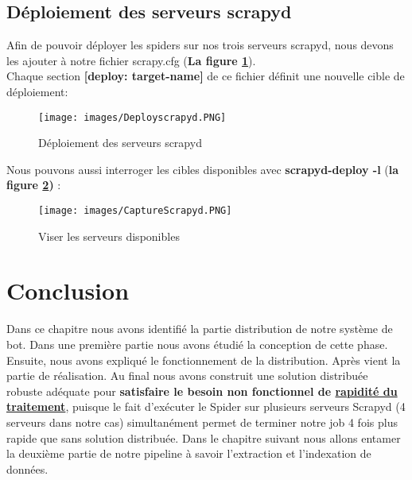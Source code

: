\subsection{Déploiement des serveurs scrapyd}
Afin de pouvoir déployer les spiders sur nos trois serveurs scrapyd, nous devons les
ajouter à notre fichier scrapy.cfg (\textbf{La figure \ref{fig:dep}}).\\
Chaque section \textbf{[deploy: target-name]} de ce fichier définit une nouvelle cible de déploiement:
\begin{figure}[H]
            \centering
            \texttt{[image: images/Deployscrapyd.PNG]}
            \caption{Déploiement des serveurs scrapyd}
            \label{fig:dep}  
        \end{figure}
\noindent Nous pouvons aussi interroger les cibles disponibles avec \textbf{scrapyd-deploy -l} (\textbf{la figure \ref{fig:vise})} :
\begin{figure}[H]
            \centering
            \texttt{[image: images/CaptureScrapyd.PNG]}
            \caption{Viser les serveurs disponibles}
            \label{fig:vise}  
        \end{figure}
\section*{Conclusion}
Dans ce chapitre nous avons identifié la partie distribution de notre système de bot. Dans une première partie nous avons étudié la conception de cette phase. Ensuite, nous avons expliqué le fonctionnement de la distribution. Après vient la partie de réalisation. Au final nous avons construit une solution distribuée robuste adéquate pour \textbf{satisfaire le besoin non fonctionnel de \underline{rapidité du traitement}}, puisque le fait d'exécuter le Spider sur plusieurs serveurs Scrapyd (4 serveurs dans notre cas) simultanément permet de terminer notre job 4 fois plus rapide que sans solution distribuée. Dans le chapitre suivant nous allons entamer la deuxième partie de notre pipeline à savoir l'extraction et l'indexation de données.